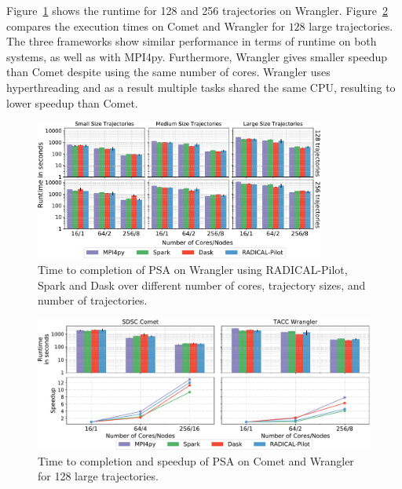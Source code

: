 Figure~\ref{fig:HausdorffWrangler} shows the runtime for 128 and 256 trajectories on Wrangler.
Figure~\ref{fig:comet_wrangler_haus} compares the execution times on Comet and Wrangler for $128$ large trajectories.
The three frameworks show similar performance in terms of runtime on both systems, as well as with MPI4py.
Furthermore, Wrangler gives smaller speedup than Comet despite using the same number of cores.
Wrangler uses hyperthreading and as a result multiple tasks shared the same CPU, resulting to lower speedup than Comet.

\begin{figure}[t]
    \centering
    \includegraphics[width=0.85\textwidth]{figures/data_analytics_hpc/task_par/HausdorffSingleFig.pdf}
    \caption{Time to completion of PSA on Wrangler using RADICAL-Pilot, Spark and Dask over different number of cores, trajectory sizes, and number of trajectories.}
            \label{fig:HausdorffWrangler}
\end{figure}

\begin{figure}[t]
    \centering
    \includegraphics[width=.85\textwidth]{figures/data_analytics_hpc/task_par/comet_wrangler_haus.pdf}
    \caption{Time to completion and speedup of PSA on Comet and Wrangler for 128 large trajectories.} 
    \label{fig:comet_wrangler_haus}
\end{figure}

